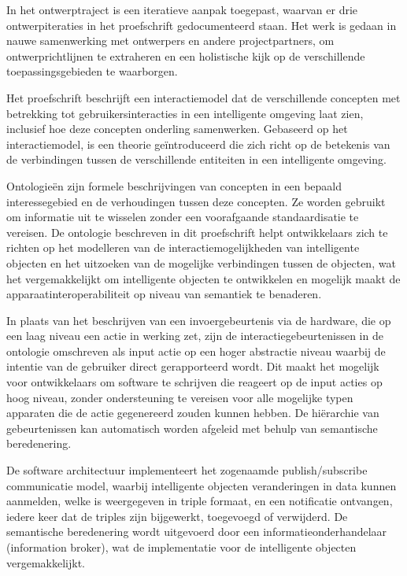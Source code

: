 In het ontwerptraject is een iteratieve aanpak toegepast, waarvan er drie ontwerpiteraties in het proefschrift gedocumenteerd staan. Het werk is gedaan in nauwe samenwerking met ontwerpers en andere projectpartners, om ontwerprichtlijnen te extraheren en een holistische kijk op de verschillende toepassingsgebieden te waarborgen. 

Het proefschrift beschrijft een interactiemodel dat de verschillende concepten met betrekking tot gebruikersinteracties in een intelligente omgeving laat zien, inclusief hoe deze concepten onderling samenwerken. Gebaseerd op het interactiemodel, is een theorie ge\"introduceerd die zich richt op de betekenis van de verbindingen tussen de verschillende entiteiten in een intelligente omgeving. 

Ontologie\"en zijn formele beschrijvingen van concepten in een bepaald interessegebied en de verhoudingen tussen deze concepten. Ze worden gebruikt om informatie uit te wisselen zonder een voorafgaande standaardisatie te vereisen. De ontologie beschreven in dit proefschrift helpt ontwikkelaars zich te richten op het modelleren van de interactiemogelijkheden van intelligente objecten en het uitzoeken van de mogelijke verbindingen tussen de objecten, wat het vergemakkelijkt om intelligente objecten te ontwikkelen en mogelijk maakt de apparaatinteroperabiliteit op niveau van semantiek te benaderen. 

In plaats van het beschrijven van een invoergebeurtenis via de hardware, die op een laag niveau een actie in werking zet, zijn de interactiegebeurtenissen in de ontologie omschreven als input actie op een hoger abstractie niveau waarbij de intentie van de gebruiker direct gerapporteerd wordt. Dit maakt het mogelijk voor ontwikkelaars om software te schrijven die reageert op de input acties op hoog niveau, zonder ondersteuning te vereisen voor alle mogelijke typen apparaten die de actie gegenereerd zouden kunnen hebben. De hi\"erarchie van gebeurtenissen kan automatisch worden afgeleid met behulp van semantische beredenering.

De software architectuur implementeert het zogenaamde publish/subscribe communicatie model, waarbij intelligente objecten veranderingen in data kunnen aanmelden, welke is weergegeven in triple formaat, en een notificatie ontvangen, iedere keer dat de triples zijn bijgewerkt, toegevoegd of verwijderd. De semantische beredenering wordt uitgevoerd door een informatieonderhandelaar (information broker), wat de implementatie voor de intelligente objecten vergemakkelijkt. 

